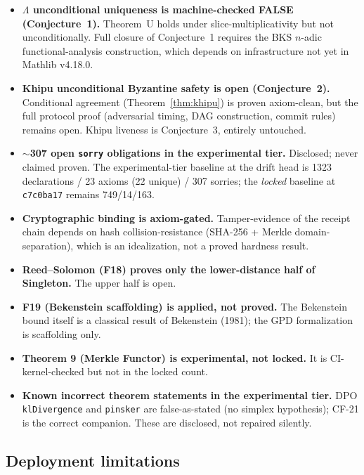 \documentclass[11pt,letterpaper]{article}
\theoremstyle{definition}
\newcommand{\Lam}{\Lambda}
\begin{document}
\begin{itemize}
\item \textbf{$\Lam$ unconditional uniqueness is machine-checked FALSE
  (Conjecture~1).}  Theorem~U holds under slice-multiplicativity but not
  unconditionally.  Full closure of Conjecture~1 requires the BKS $n$-adic
  functional-analysis construction, which depends on infrastructure not yet in
  Mathlib v4.18.0.

\item \textbf{Khipu unconditional Byzantine safety is open (Conjecture~2).}
  Conditional agreement (Theorem~\ref{thm:khipu}) is proven axiom-clean, but the
  full protocol proof (adversarial timing, DAG construction, commit rules)
  remains open.  Khipu liveness is Conjecture~3, entirely untouched.

\item \textbf{$\sim$307 open \texttt{sorry} obligations in the experimental
  tier.}  Disclosed; never claimed proven.  The experimental-tier baseline at the
  drift head is 1323 declarations / 23 axioms (22 unique) / 307 sorries;
  the \emph{locked} baseline at \texttt{c7c0ba17} remains 749/14/163.

\item \textbf{Cryptographic binding is axiom-gated.}  Tamper-evidence of the
  receipt chain depends on hash collision-resistance (SHA-256 + Merkle
  domain-separation), which is an idealization, not a proved hardness result.

\item \textbf{Reed--Solomon (F18) proves only the lower-distance half of
  Singleton.}  The upper half is open.

\item \textbf{F19 (Bekenstein scaffolding) is applied, not proved.}  The
  Bekenstein bound itself is a classical result of Bekenstein (1981); the GPD
  formalization is scaffolding only.

\item \textbf{Theorem 9 (Merkle Functor) is experimental, not locked.}  It is
  CI-kernel-checked but not in the locked count.

\item \textbf{Known incorrect theorem statements in the experimental tier.}
  DPO \texttt{klDivergence} and \texttt{pinsker} are false-as-stated (no simplex
  hypothesis); CF-21 is the correct companion.  These are disclosed, not repaired
  silently.
\end{itemize}

\subsection{Deployment limitations}
\end{document}
